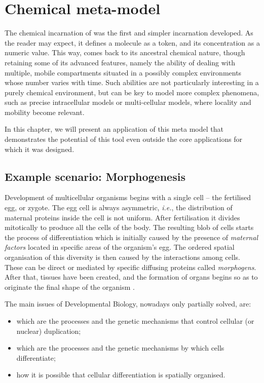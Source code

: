 \documentclass[12pt,a4paper,twoside,openright]{book}
\begin{document}
\chapter{Chemical meta-model}

The chemical incarnation of \alchemist{} was the first and simpler incarnation developed.
%
As the reader may expect, it defines a molecule as a token, and its concentration as a numeric value.
%
This way, \alchemist{} comes back to its ancestral chemical nature, though retaining some of its advanced features, namely the ability of dealing with multiple, mobile compartments situated in a possibly complex environments whose number varies with time.
%
Such abilities are not particularly interesting in a purely chemical environment, but can be key to model more complex phenomena, such as precise intracellular models or multi-cellular models, where locality and mobility become relevant.

In this chapter, we will present an application of this meta model that demonstrates the potential of this tool even outside the core applications for which it was designed.

\section{Example scenario: Morphogenesis}
\label{example-morphogenesis}
Development of multicellular organisms begins with a single cell -- the fertilised egg, or zygote.
%
The egg cell is always asymmetric, \emph{i.e.}, the distribution of maternal proteins inside the cell is not uniform.
%
After fertilisation it divides mitotically to produce all the cells of the body. 
%
The resulting blob of cells starts the process of differentiation which is initially caused by the presence of \emph{maternal factors} located in specific areas of the organism's egg.
%
The ordered spatial organisation of this diversity is then caused by the interactions among cells. These can be direct or mediated by specific diffusing proteins called \emph{morphogens}. 
%
After that, tissues have been created, and the formation of organs begins so as to originate the final shape of the organism \cite{alberts, gilbert2006-devbio}. 

The main issues of Developmental Biology, nowadays only partially solved, are:
\begin{itemize}
 \item which are the processes and the genetic mechanisms that control cellular (or nuclear) duplication;
 \item which are the processes and the genetic mechanisms by which cells differentiate;
 \item how it is possible that cellular differentiation is spatially organised.
\end{itemize}
\end{document}
